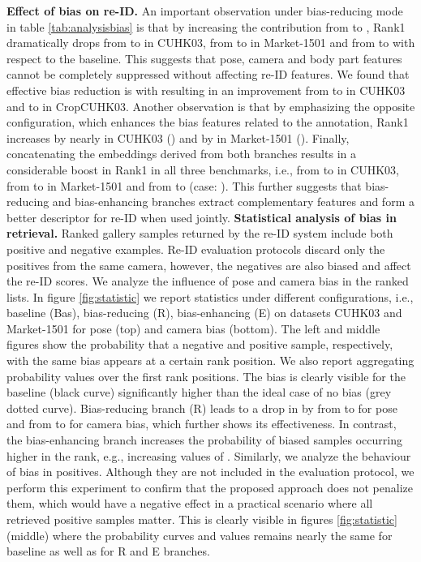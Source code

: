 \documentclass[10pt,twocolumn,letterpaper]{article}
\begin{document}
\noindent\textbf{Effect of bias on re-ID.} 
An important observation under {bias-reducing} mode in table \ref{tab:analysisbias} is that by increasing the contribution from  to , Rank1 dramatically drops from  to  in CUHK03, from  to  in Market-1501 and from  to  with respect to the baseline. This suggests that pose, camera and body part  features cannot  be completely suppressed without affecting re-ID features. We found that effective bias reduction  is with  resulting in an improvement from  to  in CUHK03 and  to  in CropCUHK03.
\newline
Another observation is that by emphasizing the opposite configuration, which enhances the bias features related to the annotation, Rank1 increases by nearly  in CUHK03 () and by  in Market-1501 (). Finally, concatenating the embeddings derived from both branches results in a considerable boost in Rank1 in all three benchmarks, i.e., from  to  in CUHK03, from  to  in Market-1501 and from  to  (case: ). This further suggests that {bias-reducing} and {bias-enhancing} branches extract complementary features and form a better descriptor for re-ID when used jointly.\newline
\noindent\textbf{Statistical analysis of bias in retrieval.} Ranked gallery samples returned by the re-ID system include both positive and negative examples. Re-ID evaluation protocols discard only the positives from the same camera, however, the negatives are also biased and affect the re-ID scores. 
We analyze the influence of pose and camera bias in the ranked lists. In figure \ref{fig:statistic} we report statistics under different configurations, i.e., baseline (Bas), bias-reducing (R), bias-enhancing (E) on datasets CUHK03 and Market-1501 for pose (top) and camera bias (bottom). The left and middle figures show the probability that a negative and positive sample, respectively, with the same bias appears at a certain rank position. We also report  aggregating probability values over the first  rank positions.
The bias is clearly visible for the baseline (black curve) significantly higher than the ideal case of no bias (grey dotted curve).  Bias-reducing branch (R) leads to a drop in  by  from  to  for pose and from  to  for camera bias, which further shows its effectiveness.
In contrast, the bias-enhancing branch increases the probability of biased samples occurring higher in the rank, e.g., increasing values of .\newline
Similarly, we analyze the behaviour of bias in positives. Although they are not included in the evaluation protocol, we perform this experiment to confirm that the proposed approach does not penalize them, which would have a negative effect in a practical scenario where all retrieved positive samples matter. { This is clearly visible in figures \ref{fig:statistic} (middle) where the probability curves and  values remains nearly the same for baseline as well as for R and E branches.}\newline
\end{document}
